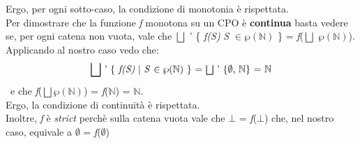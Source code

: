 {	Ergo, per ogni sotto-caso, la condizione di monotonia è rispettata.\\
	
	Per dimostrare che la funzione \textit{f} monotona su un CPO è \textbf{continua} basta vedere se, per ogni catena non vuota, vale che $\bigsqcup$ ' \{ \textit{f(S)} \textbar{} \textit{S} $\in\wp(\mathbb{N})$ \} = \textit{f}($\bigsqcup$ $\wp(\mathbb{N})$). \\ 
	Applicando al nostro caso vedo che: 
	\[ \bigsqcup$ ' \{ \textit{f(S)} \textbar{} \textit{S} $\in\wp(\mathbb{N})$ \} = $\bigsqcup$ ' \{$\emptyset$, $\mathbb{N}$\} = $\mathbb{N} \]\ 
	e che   \textit{f}($\bigsqcup\wp(\mathbb{N})$) = \textit{f}($\mathbb{N}$) = $\mathbb{N}$.\\
	Ergo, la condizione di continuità è rispettata.\\

	Inoltre, \textit{f} è \textit{strict} perchè sulla catena vuota vale che $\bot$ = \textit{f}($\bot$) che, nel nostro caso, equivale a $\emptyset$ = \textit{f}($\emptyset$)
	
}
\newpage